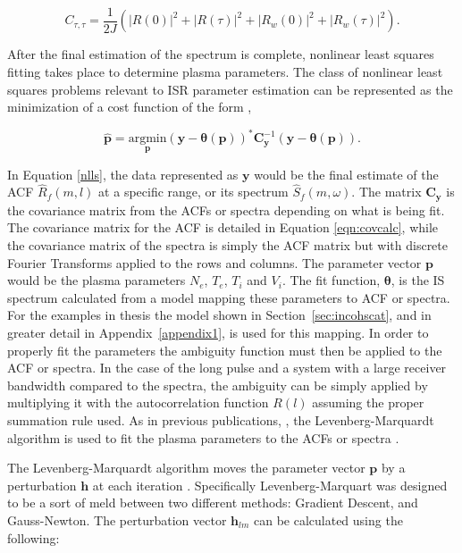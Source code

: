 \begin{equation}
\label{eqn:covdiagwn}
C_{\tau,\tau} = \frac{1}{2J} \left(  |R(0)|^2 +|R(\tau)|^2 + \left|R_w (0)\right|^2+\left|R_w (\tau)\right|^2\right).
\end{equation}


After the final estimation of the spectrum is complete, nonlinear least squares fitting takes place to determine plasma parameters.  
The class of nonlinear least squares problems relevant to ISR parameter estimation can be represented as the minimization of a cost function of the form \citep{kayvol1},

\begin{equation}
	\mathbf{\hat{p}}= \underset{\mathbf{p}}{\text{argmin}} (\mathbf{y}-\bm{\theta}(\mathbf{p}))^*\mathbf{C}_{\mathbf{y}}^{-1}(\mathbf{y}-\bm{\theta}(\mathbf{p})).
\label{nlls}
\end{equation}

In Equation \ref{nlls}, the data represented as $\mathbf{y}$ would be the final estimate of the ACF $\widehat{R}_f(m,l)$ at a specific range, or its spectrum $\widehat{S}_f(m,\omega)$. The matrix $\mathbf{C}_{\mathbf{y}}$  is the covariance matrix from the ACFs or spectra depending on what is being fit. The covariance matrix for the ACF is detailed in Equation \ref{eqn:covcalc}, while the covariance matrix of the spectra is simply the ACF matrix but with discrete Fourier Transforms applied to the rows and columns. The parameter vector $\mathbf{p}$ would be the plasma parameters $N_e$, $T_e$, $T_i$ and $V_i$. The fit function, $\bm{\theta}$, is the IS spectrum calculated from a model mapping these parameters to ACF or spectra. For the examples in thesis the model shown in Section~\ref{sec:incohscat}, and in greater detail in Appendix~\ref{appendix1}, is used for this mapping. In order to properly fit the parameters the ambiguity function must then be applied to the ACF or spectra. In the case of the long pulse and a system with a large receiver bandwidth compared to the spectra, the ambiguity can be simply applied by multiplying it with the autocorrelation function $R(l)$ assuming the proper summation rule used. As in previous publications, \citet{nikoukar2008}, the Levenberg-Marquardt algorithm is used to fit the plasma parameters to the ACFs or spectra \citep{levenberg1944,marquardt:1963}.

The Levenberg-Marquardt algorithm moves the parameter vector $\mathbf{p}$ by a perturbation $\mathbf{h}$ at each iteration \citep{gavin:2013}. Specifically Levenberg-Marquart was designed to be a sort of meld between two different methods: Gradient Descent, and Gauss-Newton. The perturbation vector $\mathbf{h}_{lm}$ can be calculated using the following:

